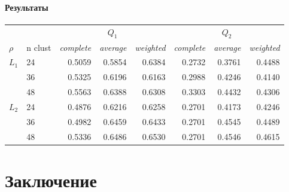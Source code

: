 \documentclass[12pt,twoside]{article}
\begin{document}
        \paragraph{Результаты}
            \begin{center}
                \begin{tabular}{ll|rrr|rrr}  
                    \toprule
                    & & \multicolumn{3}{c|}{$Q_1$} & \multicolumn{3}{c}{$Q_2$} \\
                    \cmidrule(r){3-8}
                $\rho$ & n clust & \textit{complete} & \textit{average} & \textit{weighted} & \textit{complete} & \textit{average} & \textit{weighted} \\
                    \midrule
                $L_1$   & 24    &   0.5059  &   0.5854 &    0.6384  & 0.2732   &  0.3761    &   0.4488  \\
                        & 36    &   0.5325  &   0.6196 &    0.6163  & 0.2988   &  0.4246    &   0.4140  \\
                        & 48    &   0.5563  &   0.6388 &    0.6308  & 0.3303   &  0.4432    &   0.4306  \\
                $L_2$   & 24    &   0.4876  &   0.6216 &    0.6258  & 0.2701   &  0.4173    &   0.4246  \\
                        & 36    &   0.4982  &   0.6459 &    0.6433  & 0.2701   &  0.4545    &   0.4489  \\
                        & 48    &   0.5336  &   0.6486 &    0.6530  & 0.2701   &  0.4546    &   0.4615  \\
                \bottomrule
                \end{tabular}
            \end{center}
						
	    \fi

    \section{Заключение}

     
    
    
\end{document}
